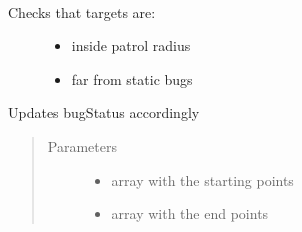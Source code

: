 \documentclass[letterpaper,10pt,english]{sphinxmanual}
\begin{document}
\begin{fulllineitems}
\label{\detokenize{reference:taipanPyRouter.checkValidTargetsPR}}~\begin{description}
\item[{Checks that targets are:}] \leavevmode\begin{itemize}
\item {} 
inside patrol radius

\item {} 
far from static bugs

\end{itemize}

\end{description}

Updates bugStatus accordingly
\begin{quote}\begin{description}
\item[{Parameters}] \leavevmode\begin{itemize}
\item {} 
 \textendash{} array with the starting points

\item {} 
 \textendash{} array with the end points

\end{itemize}

\end{description}\end{quote}

\end{fulllineitems}

\end{document}
